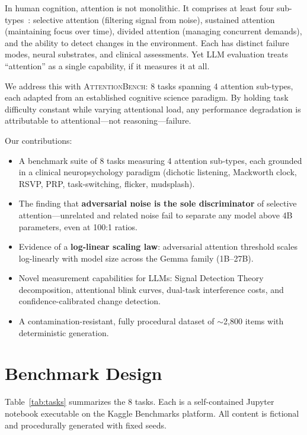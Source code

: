 \documentclass[11pt,twocolumn]{article}
\begin{document}
In human cognition, attention is not monolithic. It comprises at least four sub-types~\citep{posner1980,broadbent1958}: selective attention (filtering signal from noise), sustained attention (maintaining focus over time), divided attention (managing concurrent demands), and the ability to detect changes in the environment. Each has distinct failure modes, neural substrates, and clinical assessments. Yet LLM evaluation treats ``attention'' as a single capability, if it measures it at all.

We address this with \textsc{AttentionBench}: 8 tasks spanning 4 attention sub-types, each adapted from an established cognitive science paradigm. By holding task difficulty constant while varying attentional load, any performance degradation is attributable to attentional---not reasoning---failure.

Our contributions:
\begin{itemize}
  \item A benchmark suite of 8 tasks measuring 4 attention sub-types, each grounded in a clinical neuropsychology paradigm (dichotic listening, Mackworth clock, RSVP, PRP, task-switching, flicker, mudsplash).
  \item The finding that \textbf{adversarial noise is the sole discriminator} of selective attention---unrelated and related noise fail to separate any model above 4B parameters, even at 100:1 ratios.
  \item Evidence of a \textbf{log-linear scaling law}: adversarial attention threshold scales log-linearly with model size across the Gemma family (1B--27B).
  \item Novel measurement capabilities for LLMs: Signal Detection Theory decomposition, attentional blink curves, dual-task interference costs, and confidence-calibrated change detection.
  \item A contamination-resistant, fully procedural dataset of $\sim$2{,}800 items with deterministic generation.
\end{itemize}

\section{Benchmark Design}

Table~\ref{tab:tasks} summarizes the 8 tasks. Each is a self-contained Jupyter notebook executable on the Kaggle Benchmarks platform. All content is fictional and procedurally generated with fixed seeds.
\end{document}
